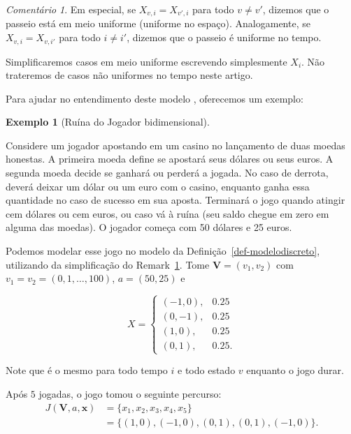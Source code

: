\documentclass[
  brazilian,
  12pt,
]{article}
\theoremstyle{definition}
\theoremstyle{definition}
\newtheorem{example}{Exemplo}[section]
\theoremstyle{remark}
\newtheorem{refremark}{Comentário}[section]
\begin{document}
\begin{refremark}
Em especial, se \(X_{v, i} = X_{v', i}\) para todo \(v \neq v'\),
dizemos que o passeio está em meio uniforme (uniforme no espaço).
Analogamente, se \(X_{v, i} = X_{v, i'}\) para todo \(i \neq i'\),
dizemos que o passeio é uniforme no tempo.

Simplificaremos casos em meio uniforme escrevendo simplesmente
\(X_{i}\). Não trateremos de casos não uniformes no tempo neste artigo.

\label{rem-uniforme}

\end{refremark}

Para ajudar no entendimento deste modelo , oferecemos um exemplo:

\begin{example}[Ruína do Jogador
bidimensional]\protect\hypertarget{exm-modelodiscreto}{}\label{exm-modelodiscreto}

Considere um jogador apostando em um casino no lançamento de duas moedas
honestas. A primeira moeda define se apostará seus dólares ou seus
euros. A segunda moeda decide se ganhará ou perderá a jogada. No caso de
derrota, deverá deixar um dólar ou um euro com o casino, enquanto ganha
essa quantidade no caso de sucesso em sua aposta. Terminará o jogo
quando atingir cem dólares ou cem euros, ou caso vá à ruína (seu saldo
chegue em zero em alguma das moedas). O jogador começa com 50 dólares e
25 euros.

Podemos modelar esse jogo no modelo da
Definição~\ref{def-modelodiscreto}, utilizando da simplificação do
Remark~\ref{rem-uniforme}. Tome \(\pmb{V} = (v_1, v_2)\) com
\(v_1 = v_2 = (0, 1, \dots, 100)\), \(a = (50, 25)\) e

\[
X = \begin{cases}
(-1, 0), & 0.25 \\
(0, -1), & 0.25 \\
(1, 0), & 0.25 \\
(0, 1), & 0.25.
\end{cases}
\]

Note que é o mesmo para todo tempo \(i\) e todo estado \(v\) enquanto o
jogo durar.

Após \(5\) jogadas, o jogo tomou o seguinte percurso: \[
\begin{aligned}
J(\pmb{V}, a, \pmb{x}) &= \{x_1, x_2, x_3, x_4, x_5\} \\
&= \{(1,0), (-1, 0), (0, 1), (0, 1), (-1, 0)\}.
\end{aligned}
\]

\end{example}
\end{document}

